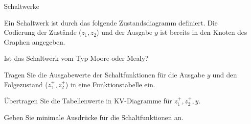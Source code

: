 \documentclass{exercisesheet}
\begin{document}
\begin{eexercises}{Schaltwerke}{
    Ein Schaltwerk ist durch das folgende Zustandsdiagramm definiert. Die Codierung der Zustände ($z_1, z_2$) und der Ausgabe $y$ ist bereits in den Knoten des Graphen angegeben.\par
    \centering
  }
  \item Ist das Schaltwerk vom Typ Moore oder Mealy?\points
  \item Tragen Sie die Ausgabewerte der Schaltfunktionen für die Ausgabe $y$ und den Folgezustand ($z_1^+, z_2^+$) in eine Funktionstabelle ein.\points[2]
  \item Übertragen Sie die Tabellenwerte in KV-Diagramme für $z_1^+, z_2^+, y$.\points[3]
  \item Geben Sie minimale Ausdrücke für die Schaltfunktionen an.\points[4]
\end{eexercises}
\end{document}
